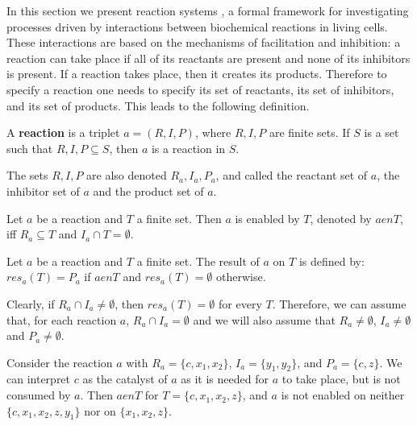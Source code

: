 In this section we present  reaction systems \cite{Rozenberg09Reaction}, a formal framework for investigating processes driven by interactions between biochemical reactions in living cells. These interactions are
based on the mechanisms of facilitation and inhibition: a reaction can take place if all of its reactants are present and none of its inhibitors is present. If a reaction takes place, then it creates its products. Therefore to specify a reaction one needs to specify its set of reactants, its set of inhibitors, and its set of products. This leads to the following definition.

\begin{definition}
  A {\bf reaction} is a triplet $a=(R,I,P)$, where $R, I, P$ are finite sets. If $S$ is a set such that $R,I,P\subseteq S$, then $a$ is a reaction in $S$.
\end{definition}

The sets $R, I, P$ are also denoted $R_a, I_a, P_a$, and called the reactant set of $a$, the inhibitor set of $a$ and the product set of $a$.

\begin{definition}
  Let $a$ be a reaction and $T$ a finite set. Then $a$ is enabled by $T$, denoted by $a \mathrel{en} T$, iff $R_a\subseteq T$ and $I_a\cap T = \emptyset$.
\end{definition}

\begin{definition}
  Let $a$ be a reaction and $T$ a finite set. The result of $a$ on $T$ is defined by: $res_a(T) = P_a$ if $a \mathrel{en} T$ and $res_a(T) = \emptyset$ otherwise.
\end{definition}

Clearly, if $R_a\cap I_a\neq\emptyset$, then $res_a(T)=\emptyset$ for every $T$. Therefore, we can assume that, for each reaction $a$, $R_a\cap I_a = \emptyset$ and we will also assume that $R_a\neq\emptyset$, $I_a\neq\emptyset$ and $P_a\neq\emptyset$.

\begin{example}
  Consider the reaction $a$ with $R_a = \{c, x_1, x_2\}$, $I_a = \{y_1, y_2\}$, and $P_a = \{c, z\}$. We can interpret $c$ as the catalyst of $a$ as it is needed for $a$ to take place, but is not consumed by $a$. Then $a \mathrel{en} T$ for $T = \{c, x_1, x_2, z\}$, and $a$ is not enabled on neither $\{c, x_1, x_2, z, y_1\}$ nor on $\{x_1, x_2, z\}$.
\end{example}

